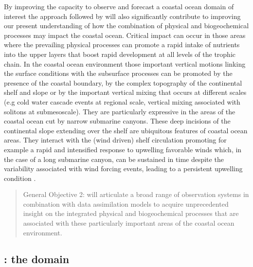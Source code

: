 By improving the capacity to observe and forecast a coastal ocean
domain of interest the approach followed by \proj will also
significantly contribute to improving our present understanding of how
the combination of physical and biogeochemical processes may impact
the coastal ocean. Critical impact can occur in those areas where the
prevailing physical processes can promote a rapid intake of nutrients
into the upper layers that boost rapid development at all levels of
the trophic chain. In the coastal ocean environment those important
vertical motions linking the surface conditions with the subsurface
processes can be promoted by the presence of the coastal boundary, by
the complex topography of the continental shelf and slope or by the
important vertical mixing that occurs at different scales (e.g cold
water cascade events at regional scale, vertical mixing associated
with solitons at submesoscale). They are particularly expressive in
the areas of the coastal ocean cut by narrow submarine canyons. These
deep incisions of the continental slope extending over the shelf are
ubiquitous features of coastal ocean areas.  They interact with the
(wind driven) shelf circulation promoting for example a rapid and
intensified response to upwelling favorable winds \cite{she00} which,
in the case of a long submarine canyon, can be sustained in time
despite the variability associated with wind forcing events, leading
to a persistent upwelling condition \cite{allen00}.

\begin{quote} 
  General Objective 2: \proj will articulate a broad range of
  observation systems in combination with data assimilation models to
  acquire unprecedented insight on the integrated physical and
  biogeochemical processes that are associated with these particularly
  important areas of the coastal ocean environment.
\end{quote} 

\subsection{\naze: the domain}
\label{sec:naz}

